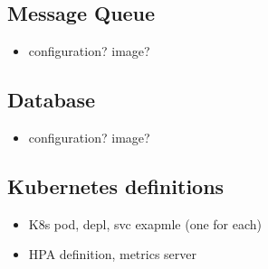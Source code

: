 \subsection{Message Queue}

\begin{itemize}
	\item configuration? image?
\end{itemize}

\subsection{Database}

\begin{itemize}
	\item configuration? image?
\end{itemize}


\subsection{Kubernetes definitions}


\begin{itemize}
	\item K8s pod, depl, svc exapmle (one for each)
	\item HPA definition, metrics server
\end{itemize}
















